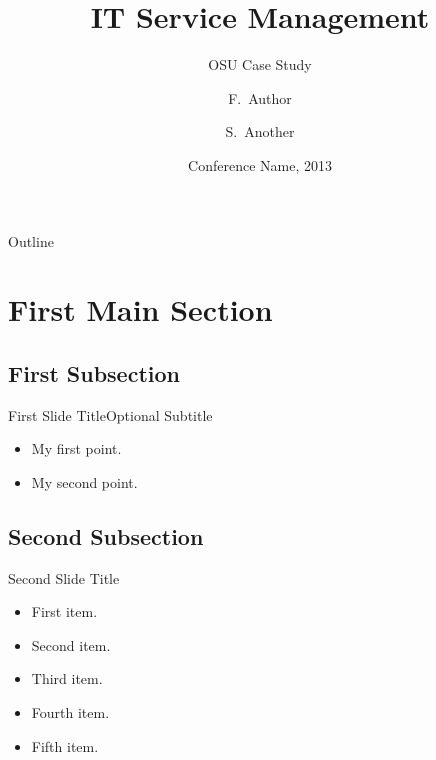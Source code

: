 \documentclass{beamer}
\title{IT Service Management}
\subtitle{OSU Case Study}
\author{F.~Author\inst{1} \and S.~Another\inst{2}}
\institute[Ohio State University] %
{
  \inst{1}%
  Department of Computer Science\\
  University of Somewhere
  \and
  \inst{2}%
  Department of Theoretical Philosophy\\
  University of Elsewhere}
\date{Conference Name, 2013}
\begin{document}
\begin{frame}
  \titlepage
\end{frame}

\begin{frame}{Outline}
  \tableofcontents
\end{frame}

\section{First Main Section}

\subsection{First Subsection}

\begin{frame}{First Slide Title}{Optional Subtitle}
  \begin{itemize}
  \item {
    My first point.
  }
  \item {
    My second point.
  }
  \end{itemize}
\end{frame}

\subsection{Second Subsection}

\begin{frame}{Second Slide Title}
  \begin{itemize}
  \item {
    First item.
    \pause %
  }
  \item {   
    Second item.
  }
  \item<3-> {
    Third item.
  }
  \item<4-> {
    Fourth item.
  }
  \item<5-> {
    Fifth item. 
  }
  \end{itemize}
\end{frame}
\end{document}
